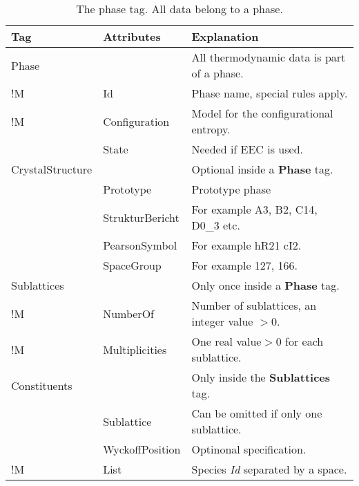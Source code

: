 \documentclass[10pt]{article}
\begin{document}
\begin{table}[!h]
  \caption{The phase tag.  All data belong to a phase.}
\begin{tabular}{|p{} p{} p{}|}\hline
  Tag & Attributes & Explanation\\\hline

  Phase & & All thermodynamic data is part of a phase.\\
!M       & Id & Phase name, special rules apply.\\

!M       & Configuration &  Model for the configurational entropy. \\

         & State & Needed if EEC is used.\\\hline

CrystalStructure & & Optional inside a {\bf Phase} tag.\\
               & Prototype & Prototype phase \\
               & StrukturBericht & For example A3, B2, C14, D0\_3 etc.\\
               & PearsonSymbol & For example hR21 cI2.\\
               & SpaceGroup & For example 127, 166.\\\hline

  Sublattices & & Only once inside a {\bf Phase} tag.\\
!M        & NumberOf &  Number of sublattices, an integer value $>0$. \\
!M        & Multiplicities & One real value$>0$ for each sublattice. \\\hline

  Constituents & & Only inside the {\bf Sublattices} tag.\\
             & Sublattice & Can be omitted if only one sublattice.\\

             & WyckoffPosition & Optinonal specification.\\

  !M           & List &  Species {\em Id} separated by a space.\\\hline


\end{tabular}
\end{table}
\end{document}
